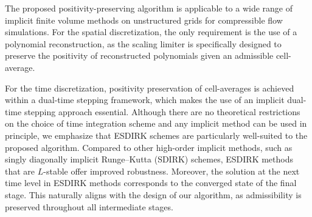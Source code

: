 The proposed positivity-preserving algorithm is applicable to a wide range of implicit finite volume methods on unstructured grids for compressible flow simulations. For the spatial discretization, the only requirement is the use of a polynomial reconstruction, as the scaling limiter is specifically designed to preserve the positivity of reconstructed polynomials given an admissible cell-average.

For the time discretization, positivity preservation of cell-averages is achieved within a dual-time stepping framework, which makes the use of an implicit dual-time stepping approach essential. Although there are no theoretical restrictions on the choice of time integration scheme and any implicit method can be used in principle, we emphasize that ESDIRK schemes are particularly well-suited to the proposed algorithm. Compared to other high-order implicit methods, such as singly diagonally implicit Runge–Kutta (SDIRK) schemes, ESDIRK methods that are $L$-stable offer improved robustness. Moreover, the solution at the next time level in ESDIRK methods corresponds to the converged state of the final stage. This naturally aligns with the design of our algorithm, as admissibility is preserved throughout all intermediate stages.



\endgroup
